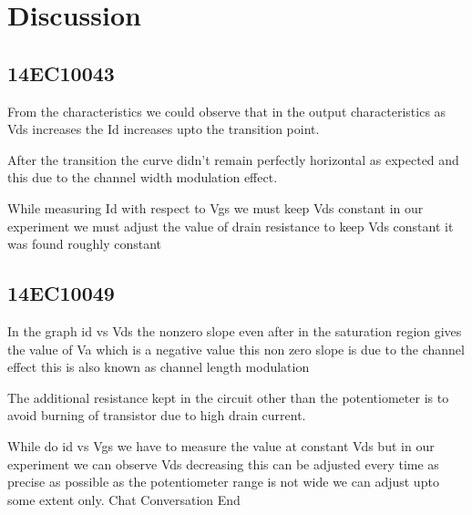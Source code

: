 \section*{Discussion}

\subsection*{14EC10043}
From the characteristics we could observe that in the output characteristics as Vds increases the Id increases upto the transition point.

After the transition the curve didn’t remain perfectly horizontal as expected and this due to the channel width modulation effect.

While measuring Id with respect to Vgs we must keep Vds constant in our experiment we must adjust the value of drain resistance to keep Vds constant it was found roughly constant

\subsection*{14EC10049}
 
In the graph id vs Vds the nonzero slope even after in the saturation region gives the value of Va which is a negative value this non zero slope is due to the channel effect this is also known as channel length modulation

The additional resistance kept in the circuit other than the potentiometer is to avoid burning of transistor due to high drain current.

While do id vs Vgs we have to measure the value at constant Vds but in our experiment we can observe Vds decreasing this can be adjusted every time as precise as possible as the potentiometer range is not wide we can adjust upto some extent only.
Chat Conversation End























